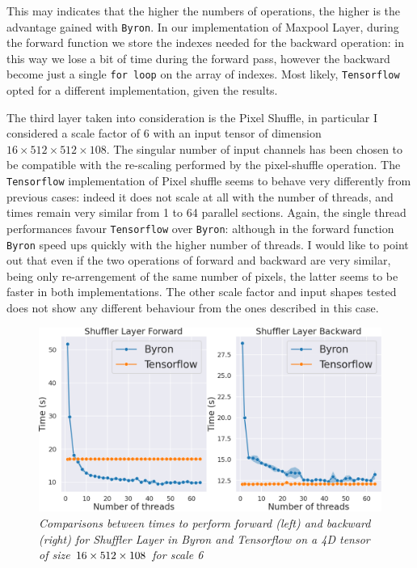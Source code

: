 \documentclass[12pt,a4paper]{report}
\begin{document}
This may indicates that the higher the numbers of operations, the higher is the advantage gained with {\tt Byron}.
In our implementation of Maxpool Layer, during the forward function we store the indexes needed for the backward operation: in this way we lose a bit of time during the forward pass, however the backward become just a single {\tt for loop} on the array of indexes. Most likely, {\tt Tensorflow} opted for a different implementation, given the results.

The third layer taken into consideration is the Pixel Shuffle, in particular I considered a scale factor of 6 with an input tensor of dimension $16 \times 512 \times 512 \times 108$. 
The singular number of input channels has been chosen to be compatible with the re-scaling performed by the pixel-shuffle operation.
The {\tt Tensorflow} implementation of Pixel shuffle seems to behave very differently from previous cases: indeed it does not scale at all with the number of threads, and times remain very similar from 1 to 64 parallel sections.
Again, the single thread performances favour {\tt Tensorflow} over {\tt Byron}: although in the forward function {\tt Byron} speed ups quickly with the higher number of threads.  
I would like to point out that even if the two operations of forward and backward are very similar, being only re-arrengement of the same number of pixels, the latter seems to be faster in both implementations.
The other scale factor and input shapes tested does not show any different behaviour from the ones described in this case.

\begin{figure}[H]
\centering
\includegraphics[scale=0.3]{./images/shuffler_timing_6.png}
\caption{\it Comparisons between times to perform forward (left) and backward (right) for Shuffler Layer in Byron and Tensorflow on a 4D tensor of size $16 \time 512 \times 512 \times 108$ for scale 6}
\label{fig:time-shuf-6}
\end{figure}
\end{document}
